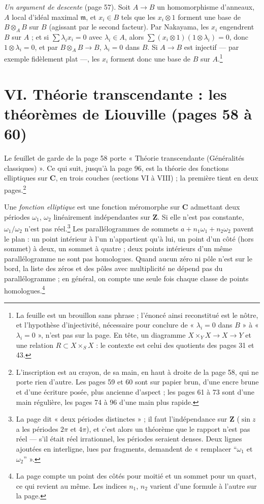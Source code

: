 \documentclass[11pt,a4paper]{article}
\begin{document}
\emph{Un argument de descente} (page 57). Soit $A \to B$ un homomorphisme
d'anneaux, $A$ local d'idéal maximal $\mathfrak{m}$, et $x_i \in B$ tels que
les $x_i \otimes 1$ forment une base de $B \otimes_A B$ sur $B$ (agissant par le
second facteur). Par Nakayama, les $x_i$ engendrent $B$ sur $A$ ; et si
$\sum\lambda_i x_i = 0$ avec $\lambda_i \in A$, alors $\sum (x_i \otimes
1)(1 \otimes \lambda_i) = 0$, donc $1 \otimes \lambda_i = 0$, et par
$B \otimes_A B \to B$, $\lambda_i = 0$ dans $B$. Si $A \to B$ est injectif ---
par exemple fidèlement plat ---, les $x_i$ forment donc une base de $B$ sur
$A$.\footnote{La feuille est un brouillon sans phrase ; l'énoncé ainsi
reconstitué est le nôtre, et l'hypothèse d'injectivité, nécessaire pour
conclure de « $\lambda_i = 0$ dans $B$ » à « $\lambda_i = 0$ », n'est pas sur la
page. En tête, un diagramme $X \times_Y X \to X \to Y$ et une relation $R
\subset X \times_S X$ : le contexte est celui des quotients des pages 31 et 43.}

\section*{VI. Théorie transcendante : les théorèmes de Liouville (pages 58 à 60)}

Le feuillet de garde de la page 58 porte « Théorie transcendante (Généralités
classiques) ». Ce qui suit, jusqu'à la page 96, est la théorie des fonctions
elliptiques sur $\mathbf{C}$, en trois couches (sections VI à VIII) ; la
première tient en deux pages.\footnote{L'inscription est au crayon, de sa
main, en haut à droite de la page 58, qui ne porte rien d'autre. Les pages 59 et
60 sont sur papier brun, d'une encre brune et d'une écriture posée, plus
ancienne d'aspect ; les pages 61 à 73 sont d'une main régulière, les pages 74 à
96 d'une main plus rapide.}

Une \emph{fonction elliptique} est une fonction méromorphe sur $\mathbf{C}$
admettant deux périodes $\omega_1$, $\omega_2$ linéairement indépendantes sur
$\mathbf{Z}$. Si elle n'est pas constante, $\omega_1/\omega_2$ n'est pas
réel.\footnote{La page dit « deux périodes distinctes » ; il faut
l'indépendance sur $\mathbf{Z}$ ($\sin z$ a les périodes $2\pi$ et $4\pi$), et
c'est alors un théorème que le rapport n'est pas réel --- s'il était réel
irrationnel, les périodes seraient denses. Deux lignes ajoutées en interligne,
lues par fragments, demandent de « remplacer “$\omega_1$ et $\omega_2$” ».} Les
parallélogrammes de sommets $a + n_1\omega_1 + n_2\omega_2$ pavent le plan :
un point intérieur à l'un n'appartient qu'à lui, un point d'un côté (hors
sommet) à deux, un sommet à quatre ; deux points intérieurs d'un même
parallélogramme ne sont pas homologues. Quand aucun zéro ni pôle n'est sur
le bord, la liste des zéros et des pôles avec multiplicité ne dépend pas du
parallélogramme ; en général, on compte une seule fois chaque classe de points
homologues.\footnote{La page compte un point des côtés pour moitié et un
sommet pour un quart, ce qui revient au même. Les indices $n_1$, $n_2$ varient
d'une formule à l'autre sur la page.}
\end{document}
